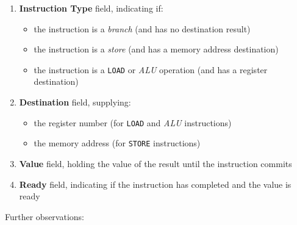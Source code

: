 \documentclass[english]{article}
\begin{document}
\begin{enumerate}
  \item \textbf{Instruction Type} field, indicating if:
        \begin{itemize}
          \item the instruction is a \textit{branch} (and has no destination result)
          \item the instruction is a \textit{store} (and has a memory address destination)
          \item the instruction is a \texttt{LOAD} or \textit{ALU} operation (and has a register destination)
        \end{itemize}
  \item \textbf{Destination} field, supplying:
        \begin{itemize}
          \item the register number (for \texttt{LOAD} and \textit{ALU} instructions)
          \item the memory address (for \texttt{STORE} instructions)
        \end{itemize}
  \item \textbf{Value} field, holding the value of the result until the instruction commits
  \item \textbf{Ready} field, indicating if the instruction has completed and the value is ready
\end{enumerate}

\bigskip
Further observations:
\end{document}
